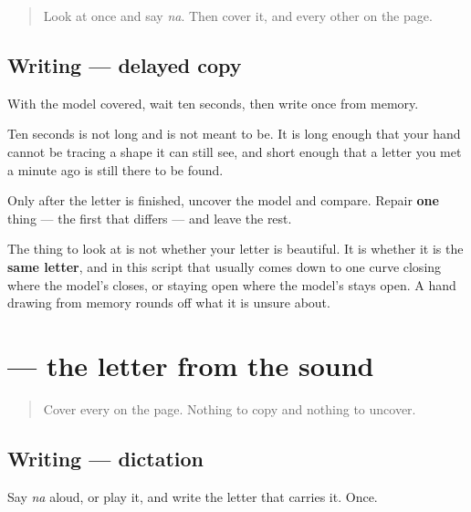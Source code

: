 \label{lesson:KA-S01-delayed-copy}



\begin{quote}
Look at \textbf{} once and say \emph{na}. Then cover it, and every other \textbf{} on the page.
\end{quote}

\subsection*{Writing — delayed copy}

With the model covered, wait ten seconds, then write \textbf{} once from memory.

Ten seconds is not long and is not meant to be. It is long enough that your hand cannot be tracing a shape it can still see, and short enough that a letter you met a minute ago is still there to be found.

Only after the letter is finished, uncover the model and compare. Repair \textbf{one} thing — the first that differs — and leave the rest.

\begin{tcolorbox}[breakable,colback=teal!4,colframe=teal!35!black,title={Before you move on}]
The thing to look at is not whether your letter is beautiful. It is whether it is the \textbf{same letter}, and in this script that usually comes down to one curve closing where the model's closes, or staying open where the model's stays open. A hand drawing from memory rounds off what it is unsure about.
\end{tcolorbox}
\section[\texorpdfstring{\kn{ನ} (na)}{ನ (na)}]{ — the letter from the sound}

\label{lesson:KA-S01-dictation}



\begin{quote}
Cover every \textbf{} on the page. Nothing to copy and nothing to uncover.
\end{quote}

\subsection*{Writing — dictation}
Say \emph{na} aloud, or play it, and write the letter that carries it. Once.

